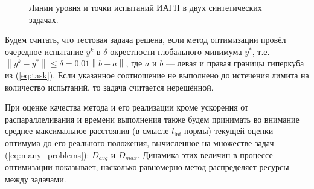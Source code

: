 \documentclass[11pt, oneside, a4paper]{article}
\begin{document}
\begin{figure}[ht]
    \centering
    \caption{Линии уровня и точки испытаний ИАГП в двух синтетических задачах.}
    \label{fig:isolines}
\end{figure}

Будем считать, что тестовая задача решена, если метод оптимизации провёл очередное испытание \(y^k\) в
\(\delta\)-окрестности глобального минимума \(y^*\), т.е. $\left\|y^k-
y^*\right\|\leqslant \delta = 0.01\left\|b-a\right\|$, где \(a\) и \(b\) --- левая и правая границы гиперкуба из (\ref{eq:task}).
Если указанное соотношение не выполнено до истечения лимита на количество испытаний, то задача считается нерешённой.

При оценке качества метода и его реализации кроме ускорения от распараллеливания и времени выполнения также будем принимать во внимание среднее максимальное расстояния (в смысле \(l_{\inf}\)-нормы) текущей оценки оптимума до его реального положения,
вычисленное на множестве задач (\ref{eq:many_problems}): \(D_{avg}\) и \(D_{max}\). Динамика этих величин в процессе оптимизации
показывает, насколько равномерно метод распределяет ресурсы между задачами.
\end{document}
